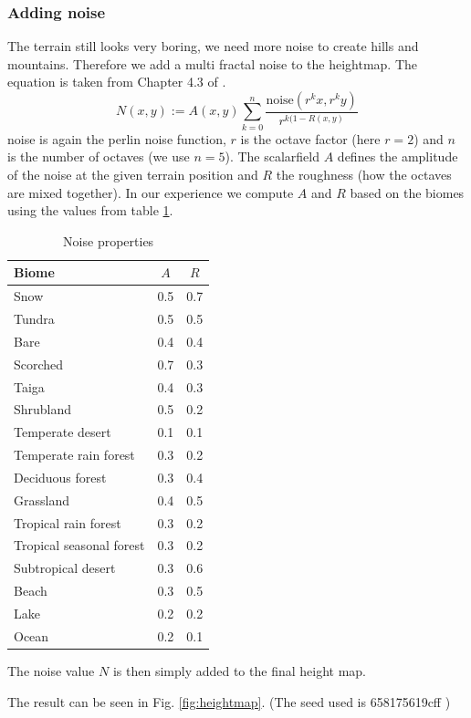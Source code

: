\documentclass[journal, letterpaper]{IEEEtran}
\begin{document}
\subsubsection{Adding noise}
The terrain still looks very boring, we need more noise to create hills and mountains.
Therefore we add a multi fractal noise to the heightmap. The equation is taken from Chapter 4.3 of \cite{Hnaidi.2010}.
\begin{equation}
	N(x,y) := A(x,y) \sum_{k=0}^n \frac{\text{noise}(r^k x, r^k y)}{r^{k(1-R(x,y)}}
\label{eq:HeightmapNoise}
\end{equation}
noise is again the perlin noise function, $r$ is the octave factor (here $r=2$) and $n$ is the number of octaves (we use $n=5$). The scalarfield $A$ defines the amplitude of the noise at the given terrain position and $R$ the roughness (how the octaves are mixed together).
In our experience we compute $A$ and $R$ based on the biomes using the values from table \ref{tab:NoiseProperties}.
\begin{table}[htbp]
	\centering
		\begin{tabular}{l|c|c}
			Biome & $A$ & $R$ \\ \hline
			Snow & 0.5 & 0.7 \\
			Tundra & 0.5 & 0.5 \\
			Bare & 0.4 & 0.4 \\
			Scorched & 0.7 & 0.3 \\
			Taiga & 0.4 & 0.3 \\
			Shrubland & 0.5 & 0.2 \\
			Temperate desert & 0.1 & 0.1 \\
			Temperate rain forest & 0.3 & 0.2 \\
			Deciduous forest & 0.3 & 0.4 \\
			Grassland & 0.4 & 0.5 \\
			Tropical rain forest & 0.3 & 0.2 \\
			Tropical seasonal forest & 0.3 & 0.2 \\
			Subtropical desert & 0.3 & 0.6 \\
			Beach & 0.3 & 0.5 \\
			Lake & 0.2 & 0.2 \\
			Ocean & 0.2 & 0.1
		\end{tabular}
	\caption{Noise properties}
	\label{tab:NoiseProperties}
\end{table}
The noise value $N$ is then simply added to the final height map.

The result can be seen in Fig. \ref{fig:heightmap}. (The seed used is 658175619cff )
\end{document}
